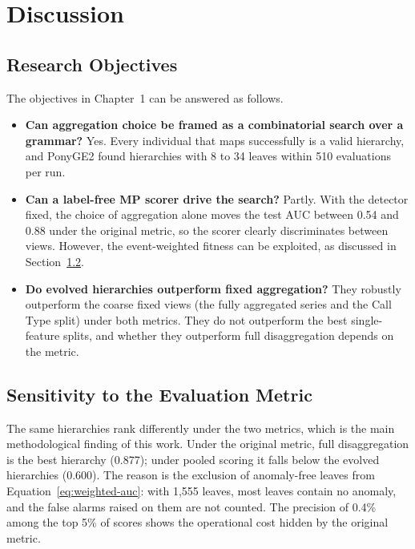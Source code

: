 \section{Discussion}
\label{sec:discussion}

\subsection{Research Objectives}

The objectives in Chapter~1 can be answered as follows.

\begin{itemize}
    \item \textbf{Can aggregation choice be framed as a combinatorial search over a grammar?}
    Yes. Every individual that maps successfully is a valid hierarchy, and PonyGE2 found hierarchies with 8 to 34 leaves within 510 evaluations per run.
    \item \textbf{Can a label-free \ac{MP} scorer drive the search?}
    Partly. With the detector fixed, the choice of aggregation alone moves the test \ac{AUC} between 0.54 and 0.88 under the original metric, so the scorer clearly discriminates between views. However, the event-weighted fitness can be exploited, as discussed in Section~\ref{sec:metric-sensitivity}.
    \item \textbf{Do evolved hierarchies outperform fixed aggregation?}
    They robustly outperform the coarse fixed views (the fully aggregated series and the Call Type split) under both metrics. They do not outperform the best single-feature splits, and whether they outperform full disaggregation depends on the metric.
\end{itemize}

\subsection{Sensitivity to the Evaluation Metric}
\label{sec:metric-sensitivity}

The same hierarchies rank differently under the two metrics, which is the main methodological finding of this work.
Under the original metric, full disaggregation is the best hierarchy (0.877); under pooled scoring it falls below the evolved hierarchies (0.600).
The reason is the exclusion of anomaly-free leaves from Equation~\ref{eq:weighted-auc}: with 1{,}555 leaves, most leaves contain no anomaly, and the false alarms raised on them are not counted.
The precision of 0.4\% among the top 5\% of scores shows the operational cost hidden by the original metric.

